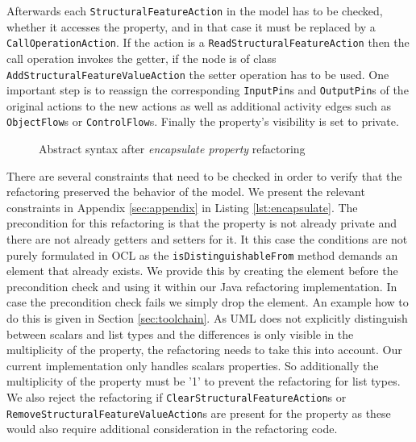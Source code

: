 \documentclass{llncs}
\begin{document}
Afterwards each \texttt{Structural\-Feature\-Action} in the model has to be checked, whether it accesses 
the property, and in that case it must be replaced by a \texttt{Call\-Operation\-Action}. If the action is a 
\texttt{Read\-Structural\-Feature\-Action} then the call operation invokes the getter, if the node is of class 
\texttt{Add\-Structural\-Feature\-Value\-Action} the setter operation has to be used. 
One important step is to reassign the corresponding \texttt{InputPin}s and \texttt{OutputPin}s of the original 
actions to the new actions as well as additional activity edges such as \texttt{ObjectFlow}s or \texttt{ControlFlow}s.
Finally the property's visibility is set to private.

\begin{figure}
 \caption{Abstract syntax after \textit{encapsulate property} refactoring}
 \label{fig:encapsulateafter}
\end{figure}


There are several constraints that need to be checked in order to verify that the refactoring preserved the behavior of the model. 
We present the relevant constraints in Appendix \ref{sec:appendix} in Listing \ref{lst:encapsulate}.
The precondition for this refactoring is that the property is not already private and there are not already getters 
and setters for it. It this case the conditions are not purely formulated in OCL as the \texttt{is\-Distinguishable\-From} method 
demands an element that already exists. We provide this by creating the element before the precondition check and using it 
within our Java refactoring implementation. In case the precondition check fails we simply drop the element. An example how 
to do this is given in Section \ref{sec:toolchain}. 
As UML does not explicitly distinguish between scalars and list types and the differences is only visible
in the multiplicity of the property, the refactoring needs to take this into account. Our current implementation only handles
scalars properties. So additionally the multiplicity of the property must be '1' to prevent the refactoring for list types. We also reject 
the refactoring if \texttt{Clear\-Structural\-Feature\-Action}s or \texttt{Remove\-Structural\-Feature\-Value\-Action}s are present for 
the property as these would also require additional consideration in the refactoring code.
\end{document}
